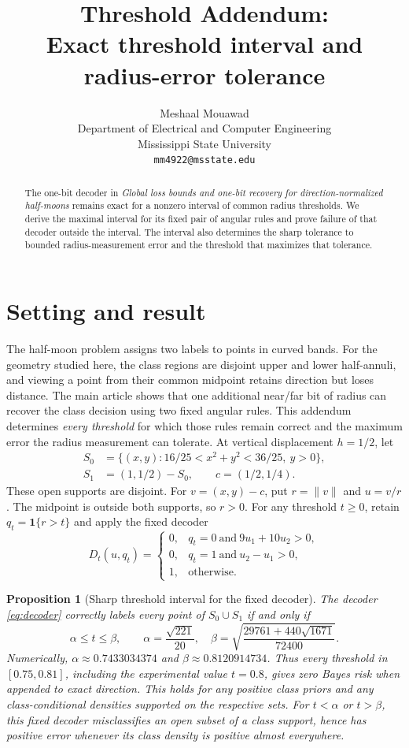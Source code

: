 \documentclass[11pt,a4paper]{article}
\title{Threshold Addendum:\\Exact threshold interval and radius-error tolerance}
\author{Meshaal Mouawad\\Department of Electrical and Computer Engineering\\Mississippi State University\\\texttt{mm4922@msstate.edu}}
\date{}
\newtheorem{proposition}{Proposition}
\numberwithin{equation}{section}
\begin{document}
\maketitle
\begin{abstract}
The one-bit decoder in \emph{Global loss bounds and one-bit recovery for direction-normalized half-moons} remains exact for a nonzero interval of common radius thresholds. We derive the maximal interval for its fixed pair of angular rules and prove failure of that decoder outside the interval. The interval also determines the sharp tolerance to bounded radius-measurement error and the threshold that maximizes that tolerance.
\end{abstract}
\section{Setting and result}
The half-moon problem assigns two labels to points in curved bands. For the geometry studied here, the class regions are disjoint upper and lower half-annuli, and viewing a point from their common midpoint retains direction but loses distance. The main article shows that one additional near/far bit of radius can recover the class decision using two fixed angular rules. This addendum determines \emph{every threshold} for which those rules remain correct and the maximum error the radius measurement can tolerate. At vertical displacement $h=1/2$, let
\begin{align}
S_0&=\{(x,y):16/25<x^2+y^2<36/25,\ y>0\},\nonumber\\
S_1&=(1,1/2)-S_0,\qquad c=(1/2,1/4).
\end{align}
These open supports are disjoint. For $v=(x,y)-c$, put $r=\|v\|$ and $u=v/r$. The midpoint is outside both supports, so $r>0$. For any threshold $t\geq0$, retain $q_t=\mathbf1\{r>t\}$ and apply the fixed decoder
\begin{equation}
D_t(u,q_t)=
\begin{cases}
0,&q_t=0\ \text{and}\ 9u_1+10u_2>0,\\
0,&q_t=1\ \text{and}\ u_2-u_1>0,\\
1,&\text{otherwise}.
\end{cases}\label{eq:decoder}
\end{equation}
\begin{proposition}[Sharp threshold interval for the fixed decoder]\label{prop:interval}
The decoder \eqref{eq:decoder} correctly labels every point of $S_0\cup S_1$ if and only if
\begin{equation}
\alpha\leq t\leq\beta,\qquad
\alpha=\frac{\sqrt{221}}{20},\quad
\beta=\sqrt{\frac{29761+440\sqrt{1671}}{72400}}.
\label{eq:interval}
\end{equation}
Numerically, $\alpha\approx0.7433034374$ and $\beta\approx0.8120914734$. Thus every threshold in $[0.75,0.81]$, including the experimental value $t=0.8$, gives zero Bayes risk when appended to exact direction. This holds for any positive class priors and any class-conditional densities supported on the respective sets. For $t<\alpha$ or $t>\beta$, this fixed decoder misclassifies an open subset of a class support, hence has positive error whenever its class density is positive almost everywhere.
\end{proposition}
\end{document}
